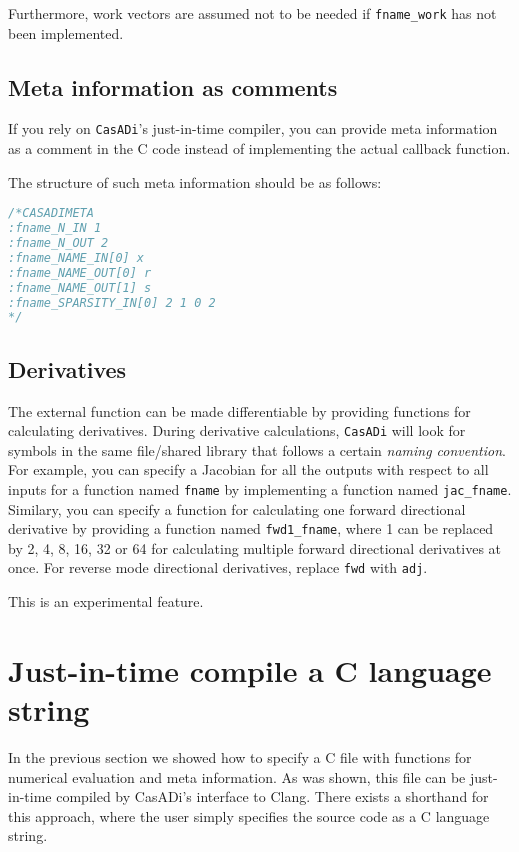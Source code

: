 \documentclass[a4paper,12pt]{book}
\newcommand{\CasADi}{\texttt{CasADi}\xspace}
\begin{document}
Furthermore, work vectors are assumed not to be needed if \verb|fname_work| has
not been implemented.

\subsection*{Meta information as comments}
If you rely on \CasADi's just-in-time compiler, you can provide meta information
as a comment in the C code instead of implementing the actual callback function.

The structure of such meta information should be as follows:
\begin{lstlisting}[language=C]
/*CASADIMETA
:fname_N_IN 1
:fname_N_OUT 2
:fname_NAME_IN[0] x
:fname_NAME_OUT[0] r
:fname_NAME_OUT[1] s
:fname_SPARSITY_IN[0] 2 1 0 2
*/
\end{lstlisting}

\subsection*{Derivatives}
The external function can be made differentiable by providing functions for
calculating derivatives. During derivative calculations, \CasADi will look for
symbols in the same file/shared library that follows a certain
\emph{naming convention}. For example, you can specify a Jacobian for all the
outputs with respect to all inputs for a function named \verb|fname| by
implementing a function named \verb|jac_fname|. Similary, you can specify
a function for calculating one forward directional derivative by providing a
function named \verb|fwd1_fname|, where 1 can be replaced by 2, 4, 8, 16,
32 or 64 for calculating multiple forward directional derivatives at once.
For reverse mode directional derivatives, replace \verb|fwd| with \verb|adj|.

This is an experimental feature.

\section{Just-in-time compile a C language string} \label{sec:jit_function}
In the previous section we showed how to specify a C file with functions for numerical
evaluation and meta information. As was shown, this file can be just-in-time
compiled by CasADi's interface to Clang. There exists a shorthand for this approach,
where the user simply specifies the source code as a C language string.
\end{document}
